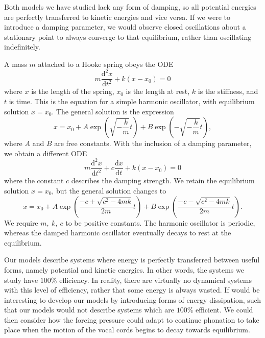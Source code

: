\documentclass{report}
\begin{document}
Both models we have studied lack any form of damping,
so all potential energies are perfectly transferred to kinetic energies and vice versa.
If we were to introduce a damping parameter,
we would observe closed oscillations about a stationary point to always converge to that equilibrium,
rather than oscillating indefinitely.

A mass $m$ attached to a Hooke spring obeys the ODE
\begin{equation*}
	m\frac{\mathrm{d}^2 x}{\mathrm{d}t^2} + k(x-x_0) = 0
\end{equation*}
where $x$ is the length of the spring, $x_0$ is the length at rest,
$k$ is the stiffness,
and $t$ is time.
This is the equation for a simple harmonic oscillator,
with equilibrium solution $x=x_0$.
The general solution is the expression
\begin{equation*}
	x = x_0 + A\exp \left(
		\sqrt{-\frac{k}{m}}t
	\right) + B\exp \left(
		-\sqrt{-\frac{k}{m}}t
	\right),
\end{equation*}
where $A$ and $B$ are free constants.
With the inclusion of a damping parameter,
we obtain a different ODE
\begin{equation*}
	m\frac{\mathrm{d}^2 x}{\mathrm{d}t^2} + c\frac{\mathrm{d}x}{\mathrm{d}t} + k(x-x_0) = 0
\end{equation*}
where the constant $c$ describes the damping strength.
We retain the equilibrium solution $x=x_0$, but the general solution changes to
\begin{equation*}
	x = x_0 + A \exp \left(
		\frac{-c+\sqrt{c^2-4mk}}{2m}t
	\right) + B \exp \left(
		\frac{-c-\sqrt{c^2-4mk}}{2m}t
	\right).
\end{equation*}
We require $m,~k,~c$ to be positive constants.
The harmonic oscillator is periodic,
whereas the damped harmonic oscillator eventually decays to rest at the equilibrium.

Our models describe systems where energy is perfectly transferred between useful forms,
namely potential and kinetic energies.
In other words, the systems we study have $100\%$ efficiency.
In reality, there are virtually no dynamical systems with this level of efficiency,
rather that some energy is always wasted.
If would be interesting to develop our models by introducing forms of energy dissipation,
such that our models would not describe systems which are $100\%$ efficient.
We could then consider how the forcing pressure could adapt to continue phonation to take place when the motion of the vocal cords begins to decay towards equilibrium.
\end{document}
